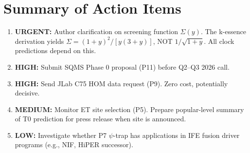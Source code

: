 \documentclass[11pt]{article}
\begin{document}
\section{Summary of Action Items}
\label{sec:actions}

\begin{tcolorbox}[colback=yellow!5!white, colframe=yellow!70!black,
  title=\textbf{ACTION ITEMS (PATENT TEAM)}]

\begin{enumerate}
\item \textbf{URGENT:}  Author clarification on screening function
  $\Sigma(y)$.  The k-essence derivation yields $\Sigma = (1+y)^2/[y(3+y)]$,
  NOT $1/\sqrt{1+y}$.  All clock predictions depend on this.

\item \textbf{HIGH:}  Submit SQMS Phase 0 proposal (P11) before
  Q2--Q3 2026 call.

\item \textbf{HIGH:}  Send JLab C75 HOM data request (P9).  Zero cost,
  potentially decisive.

\item \textbf{MEDIUM:}  Monitor ET site selection (P5).  Prepare
  popular-level summary of T0 prediction for press release when
  site is announced.

\item \textbf{LOW:}  Investigate whether P7 $\psi$-trap has applications
  in IFE fusion driver programs (e.g., NIF, HiPER successor).
\end{enumerate}

\end{tcolorbox}
\end{document}
